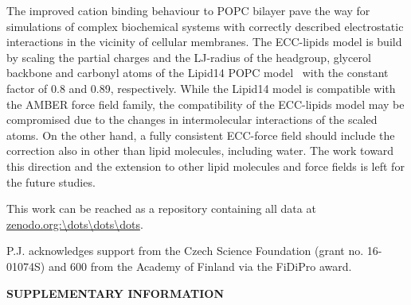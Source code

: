 \documentclass[aip,jcp,twocolumn]{revtex4}
\begin{document}
The improved cation binding behaviour to POPC bilayer pave the way for
simulations of complex biochemical systems with correctly described
electrostatic interactions in the vicinity of cellular membranes.
The ECC-lipids model is build by scaling the partial charges
and the LJ-radius of the headgroup, glycerol backbone and carbonyl atoms of
the Lipid14 POPC model~\cite{dickson14} with the constant factor
of 0.8 and 0.89, respectively. While the Lipid14 model
is compatible with the AMBER force field family, the compatibility of
the ECC-lipids model may be compromised due to the changes in intermolecular
interactions of the scaled atoms. On the other hand, a fully consistent
ECC-force field should include the correction also in other than lipid
molecules, including water. The work toward this direction and the extension
to other lipid molecules and force fields is left for the future studies.





This work can be reached as a repository containing all data at \url{zenodo.org:\dots\dots\dots}.



\begin{acknowledgments}
P.J. acknowledges support from the Czech Science Foundation (grant no. 16-01074S) 
and 600 from the Academy of Finland via the FiDiPro award.
\end{acknowledgments}


\newpage
\newpage
\appendix


\begin{center}
{\bf SUPPLEMENTARY INFORMATION}
\end{center}
\end{document}
